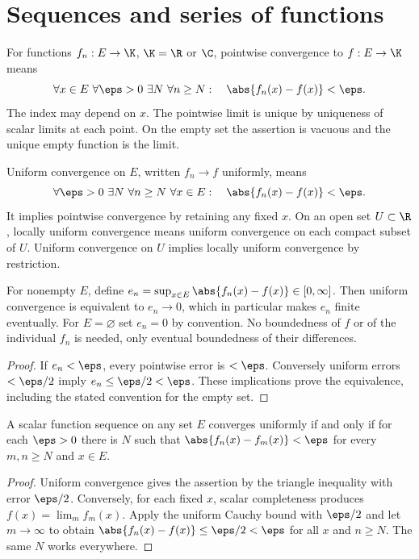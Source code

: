 \chapter{Sequences and series of functions}

\begin{definition}
For functions $f_n:E\to\K$, $\K=\R$ or $\C$, pointwise convergence to $f:E\to\K$ means
\[\forall x\in E\ \forall\eps>0\ \exists N\ \forall n\geq N:\quad\abs{f_n(x)-f(x)}<\eps.\]
The index may depend on $x$. The pointwise limit is unique by uniqueness of scalar limits at each point. On the empty set the assertion is vacuous and the unique empty function is the limit.
\end{definition}

\begin{definition}
Uniform convergence on $E$, written $f_n\to f$ uniformly, means
\[\forall\eps>0\ \exists N\ \forall n\geq N\ \forall x\in E:\quad\abs{f_n(x)-f(x)}<\eps.\]
It implies pointwise convergence by retaining any fixed $x$. On an open set $U\subset\R$, locally uniform convergence means uniform convergence on each compact subset of $U$. Uniform convergence on $U$ implies locally uniform convergence by restriction.
\end{definition}

\begin{theorem}
For nonempty $E$, define $e_n=\sup_{x\in E}\abs{f_n(x)-f(x)}\in[0,\infty]$. Then uniform convergence is equivalent to $e_n\to0$, which in particular makes $e_n$ finite eventually. For $E=\varnothing$ set $e_n=0$ by convention. No boundedness of $f$ or of the individual $f_n$ is needed, only eventual boundedness of their differences.
\end{theorem}
\begin{proof}
If $e_n<\eps$, every pointwise error is $<\eps$. Conversely uniform errors $<\eps/2$ imply $e_n\leq\eps/2<\eps$. These implications prove the equivalence, including the stated convention for the empty set.
\end{proof}

\begin{theorem}
A scalar function sequence on any set $E$ converges uniformly if and only if for each $\eps>0$ there is $N$ such that $\abs{f_n(x)-f_m(x)}<\eps$ for every $m,n\geq N$ and $x\in E$.
\end{theorem}
\begin{proof}
Uniform convergence gives the assertion by the triangle inequality with error $\eps/2$. Conversely, for each fixed $x$, scalar completeness produces $f(x)=\lim_m f_m(x)$. Apply the uniform Cauchy bound with $\eps/2$ and let $m\to\infty$ to obtain $\abs{f_n(x)-f(x)}\leq\eps/2<\eps$ for all $x$ and $n\geq N$. The same $N$ works everywhere.
\end{proof}

